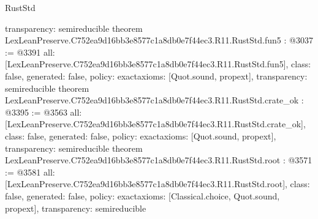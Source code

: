 \begin{lexlean}{RustStd}
\begin{coremodule}
{  transparency: semireducible
}
theorem LexLeanPreserve.C752ea9d16bb3e8577c1a8db0e7f44ec3.R11.RustStd.fun5 : @3037 := @3391 {
  all: [LexLeanPreserve.C752ea9d16bb3e8577c1a8db0e7f44ec3.R11.RustStd.fun5],
  class: false,
  generated: false,
  policy: exact{axioms: [Quot.sound, propext]},
  transparency: semireducible
}
theorem LexLeanPreserve.C752ea9d16bb3e8577c1a8db0e7f44ec3.R11.RustStd.crate_ok : @3395 := @3563 {
  all: [LexLeanPreserve.C752ea9d16bb3e8577c1a8db0e7f44ec3.R11.RustStd.crate_ok],
  class: false,
  generated: false,
  policy: exact{axioms: [Quot.sound, propext]},
  transparency: semireducible
}
theorem LexLeanPreserve.C752ea9d16bb3e8577c1a8db0e7f44ec3.R11.RustStd.root : @3571 := @3581 {
  all: [LexLeanPreserve.C752ea9d16bb3e8577c1a8db0e7f44ec3.R11.RustStd.root],
  class: false,
  generated: false,
  policy: exact{axioms: [Classical.choice, Quot.sound, propext]},
  transparency: semireducible
}


\end{coremodule}
\end{lexlean}
